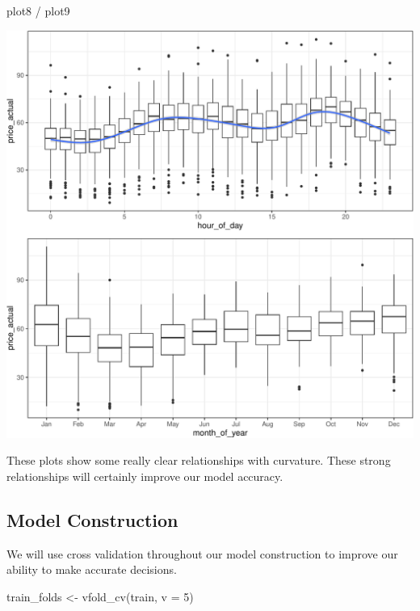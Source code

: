 \documentclass[
]{article}
\newenvironment{Shaded}{\begin{snugshade}}{\end{snugshade}}
\newcommand{\AttributeTok}[1]{\textcolor[rgb]{0.40,0.45,0.13}{#1}}
\newcommand{\DecValTok}[1]{\textcolor[rgb]{0.68,0.00,0.00}{#1}}
\newcommand{\FunctionTok}[1]{\textcolor[rgb]{0.28,0.35,0.67}{#1}}
\newcommand{\NormalTok}[1]{\textcolor[rgb]{0.00,0.23,0.31}{#1}}
\newcommand{\OtherTok}[1]{\textcolor[rgb]{0.00,0.23,0.31}{#1}}
\newcommand{\SpecialCharTok}[1]{\textcolor[rgb]{0.37,0.37,0.37}{#1}}
\begin{document}
\begin{Shaded}
\begin{Highlighting}[]
\NormalTok{plot8 }\SpecialCharTok{/}\NormalTok{ plot9}
\end{Highlighting}
\end{Shaded}

\includegraphics{Analytics_Report_files/figure-pdf/plot89-1.pdf}

These plots show some really clear relationships with curvature. These
strong relationships will certainly improve our model accuracy.

\subsection{Model Construction}\label{model-construction}

We will use cross validation throughout our model construction to
improve our ability to make accurate decisions.

\begin{Shaded}
\begin{Highlighting}[]
\NormalTok{train\_folds }\OtherTok{\textless{}{-}} \FunctionTok{vfold\_cv}\NormalTok{(train, }\AttributeTok{v =} \DecValTok{5}\NormalTok{)}
\end{Highlighting}
\end{Shaded}
\end{document}
